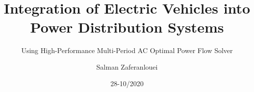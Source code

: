 	\title[Your Short Title]{Integration of Electric Vehicles into Power Distribution Systems}
	\subtitle{Using High-Performance Multi-Period AC Optimal Power Flow Solver}
	\author{Salman Zaferanlouei}
	\date{28-10/2020}
